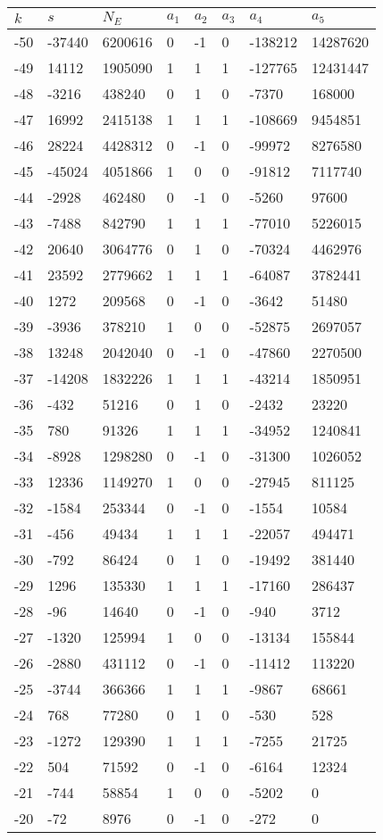 \documentclass{amsart}
\begin{document}
\begin{longtable}{|l|l|l|lllll|}
\hline
$k$ & $s$ & $N_E$ & $a_1$ & $a_2$ & $a_3$ & $a_4$ & $a_5$\\
\hline
-50&-37440&6200616&0&-1&0&-138212&14287620\\
-49&14112&1905090&1&1&1&-127765&12431447\\
-48&-3216&438240&0&1&0&-7370&168000\\
-47&16992&2415138&1&1&1&-108669&9454851\\
-46&28224&4428312&0&-1&0&-99972&8276580\\
-45&-45024&4051866&1&0&0&-91812&7117740\\
-44&-2928&462480&0&-1&0&-5260&97600\\
-43&-7488&842790&1&1&1&-77010&5226015\\
-42&20640&3064776&0&1&0&-70324&4462976\\
-41&23592&2779662&1&1&1&-64087&3782441\\
-40&1272&209568&0&-1&0&-3642&51480\\
-39&-3936&378210&1&0&0&-52875&2697057\\
-38&13248&2042040&0&-1&0&-47860&2270500\\
-37&-14208&1832226&1&1&1&-43214&1850951\\
-36&-432&51216&0&1&0&-2432&23220\\
-35&780&91326&1&1&1&-34952&1240841\\
-34&-8928&1298280&0&-1&0&-31300&1026052\\
-33&12336&1149270&1&0&0&-27945&811125\\
-32&-1584&253344&0&-1&0&-1554&10584\\
-31&-456&49434&1&1&1&-22057&494471\\
-30&-792&86424&0&1&0&-19492&381440\\
-29&1296&135330&1&1&1&-17160&286437\\
-28&-96&14640&0&-1&0&-940&3712\\
-27&-1320&125994&1&0&0&-13134&155844\\
-26&-2880&431112&0&-1&0&-11412&113220\\
-25&-3744&366366&1&1&1&-9867&68661\\
-24&768&77280&0&1&0&-530&528\\
-23&-1272&129390&1&1&1&-7255&21725\\
-22&504&71592&0&-1&0&-6164&12324\\
-21&-744&58854&1&0&0&-5202&0\\
-20&-72&8976&0&-1&0&-272&0\\

\end{longtable}
\end{document}
